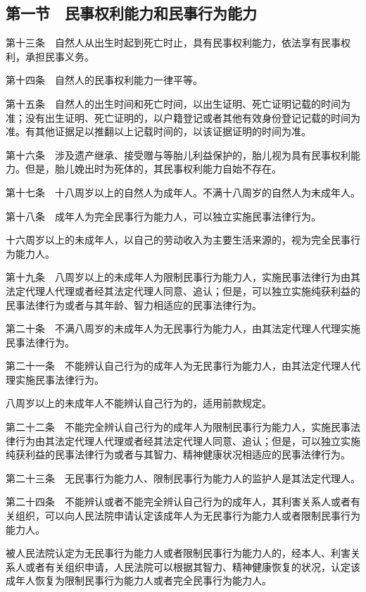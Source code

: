 \documentclass[UTF8,12pt,a4paper]{ctexbook}
\begin{document}
\subsection*{第一节　民事权利能力和民事行为能力}

第十三条　自然人从出生时起到死亡时止，具有民事权利能力，依法享有民事权利，承担民事义务。

第十四条　自然人的民事权利能力一律平等。

第十五条　自然人的出生时间和死亡时间，以出生证明、死亡证明记载的时间为准；没有出生证明、死亡证明的，以户籍登记或者其他有效身份登记记载的时间为准。有其他证据足以推翻以上记载时间的，以该证据证明的时间为准。

第十六条　涉及遗产继承、接受赠与等胎儿利益保护的，胎儿视为具有民事权利能力。但是，胎儿娩出时为死体的，其民事权利能力自始不存在。

第十七条　十八周岁以上的自然人为成年人。不满十八周岁的自然人为未成年人。

第十八条　成年人为完全民事行为能力人，可以独立实施民事法律行为。

十六周岁以上的未成年人，以自己的劳动收入为主要生活来源的，视为完全民事行为能力人。

第十九条　八周岁以上的未成年人为限制民事行为能力人，实施民事法律行为由其法定代理人代理或者经其法定代理人同意、追认；但是，可以独立实施纯获利益的民事法律行为或者与其年龄、智力相适应的民事法律行为。

第二十条　不满八周岁的未成年人为无民事行为能力人，由其法定代理人代理实施民事法律行为。

第二十一条　不能辨认自己行为的成年人为无民事行为能力人，由其法定代理人代理实施民事法律行为。

八周岁以上的未成年人不能辨认自己行为的，适用前款规定。

第二十二条　不能完全辨认自己行为的成年人为限制民事行为能力人，实施民事法律行为由其法定代理人代理或者经其法定代理人同意、追认；但是，可以独立实施纯获利益的民事法律行为或者与其智力、精神健康状况相适应的民事法律行为。

第二十三条　无民事行为能力人、限制民事行为能力人的监护人是其法定代理人。

第二十四条　不能辨认或者不能完全辨认自己行为的成年人，其利害关系人或者有关组织，可以向人民法院申请认定该成年人为无民事行为能力人或者限制民事行为能力人。

被人民法院认定为无民事行为能力人或者限制民事行为能力人的，经本人、利害关系人或者有关组织申请，人民法院可以根据其智力、精神健康恢复的状况，认定该成年人恢复为限制民事行为能力人或者完全民事行为能力人。
\end{document}
